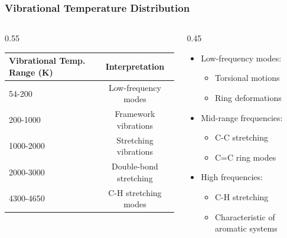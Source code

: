 \documentclass[aspectratio=169, 9pt]{beamer}
\begin{document}
\begin{frame}
\frametitle{Vibrational Temperature Distribution}
\begin{columns}
\begin{column}{0.55\textwidth}
\begin{center}
\begin{tabular}{|l|c|}
\hline
\textbf{Vibrational Temp. Range (K)} & \textbf{Interpretation} \\
\hline
54-200 & Low-frequency modes \\
\hline
200-1000 & Framework vibrations \\
\hline
1000-2000 & Stretching vibrations \\
\hline
2000-3000 & Double-bond stretching \\
\hline
4300-4650 & C-H stretching modes \\
\hline
\end{tabular}
\end{center}
\end{column}
\begin{column}{0.45\textwidth}
\begin{itemize}
\item Low-frequency modes:
  \begin{itemize}
  \item Torsional motions
  \item Ring deformations
  \end{itemize}
\item Mid-range frequencies:
  \begin{itemize}
  \item C-C stretching
  \item C=C ring modes
  \end{itemize}
\item High frequencies:
  \begin{itemize}
  \item C-H stretching
  \item Characteristic of aromatic systems
  \end{itemize}
\end{itemize}
\end{column}
\end{columns}
\end{frame}
\end{document}
